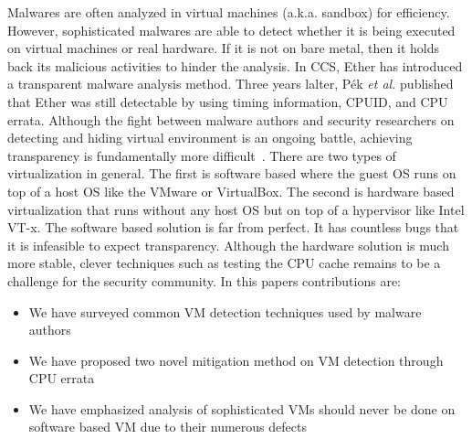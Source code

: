Malwares are often analyzed in virtual machines (a.k.a. sandbox) for efficiency. However, sophisticated malwares are able to detect whether it is being executed on virtual machines or real hardware. If it is not on bare metal, then it holds back its malicious activities to hinder the analysis. In CCS, Ether \cite{ether} has introduced a transparent malware analysis method. Three years lalter, P{\'e}k \textit{et al.}\cite{nether} published that Ether\cite{ether} was still detectable by using timing information, CPUID, and CPU errata. Although the fight between malware authors and security researchers on detecting and hiding virtual environment is an ongoing battle, achieving transparency is fundamentally more difficult~\cite{garfinkel2007}.
There are two types of virtualization in general. The first is software based where the guest OS runs on top of a host OS like the VMware or VirtualBox. The second is hardware based virtualization that runs without any host OS but on top of a hypervisor like Intel VT-x. The software based solution is far from perfect. It has countless bugs that it is infeasible to expect transparency. Although the hardware solution is much more stable, clever techniques such as testing the CPU cache remains to be a challenge for the security community.
In this paper\textquotesingle s contributions are:

\begin{itemize}
\item We have surveyed common VM detection techniques used by malware authors
\item We have proposed two novel mitigation method on VM detection through CPU errata
\item We have emphasized analysis of sophisticated VMs should never be done on software based VM due to their numerous defects 
\end{itemize}

